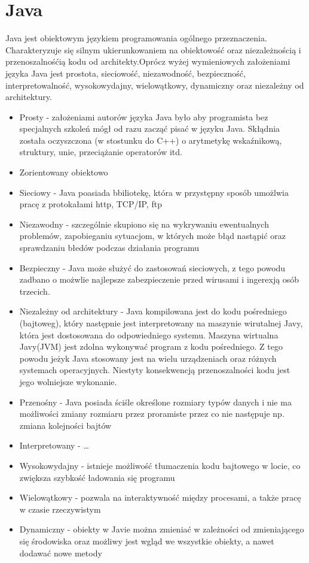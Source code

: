 \documentclass[eng,printmode,oneside]{mgr}
\begin{document}
\section{Java}

Java jest obiektowym językiem programowania ogólnego przeznaczenia.
Charakteryzuje się silnym ukierunkowaniem na obiektowość oraz niezależnością i
przenoszalnośćią kodu od architekty.Oprócz wyżej wymieniowych założeniami języka
Java jest prostota, sieciowość, niezawodność, bezpieczność, interpretowalność, wysokowydajny,
wielowątkowy, dynamiczny oraz niezależny od architektury. 
\begin{itemize}
  \item Prosty - założeniami autorów języka Java było aby programista bez
  specjalnych szkoleń mógł od razu zacząć pisać w języku Java. Skłądnia została
  oczyszczona (w stostunku do C++) o arytmetykę wskaźnikową, struktury, unie,
  przeciążanie operatorów itd.
  \item Zorientowany obiektowo
  \item Sieciowy - Java poasiada bbiliotekę, która w przystępny sposób umożlwia
  pracę z protokałami http, TCP/IP, ftp
  \item Niezawodny - szczególnie skupiono się na wykrywaniu ewentualnych
  problemów, zapobieganiu sytuacjom, w których może błąd nastąpić oraz
  sprawdzaniu błedów podczas działania programu
  \item Bezpieczny - Java może służyć do zastosowań sieciowych, z tego powodu
  zadbano o możwlie najlepsze zabezpieczenie przed wirusami i ingerexją osób
  trzecich.
  \item Niezależny od architektury - Java kompilowana jest do kodu pośredniego
  (bajtoweg), który następnie jest interpretowany na maszynie wirutalnej Javy,
  która jest dostosowana do odpowiedniego systemu. Maszyna wirtualna Javy(JVM)
  jest zdolna wykonywać program z kodu pośredniego. Z tego powodu jeżyk Java
  stosowany jest na wielu urządzeniach oraz różnych systemach operacyjnych.
  Niestyty konsekwencją przenoszalności kodu jest jego wolniejsze wykonanie.
  \item Przenośny - Java posiada ściśle określone rozmiary typów danych i nie ma
  możliwości zmiany rozmiaru przez proramiste przez co nie następuje np. zmiana
  kolejności bajtów
  \item Interpretowany - \ldots
  \item Wysokowydajny - istnieje możliwość tłumaczenia kodu bajtowego w locie,
  co zwiększa szybkość ładowania się programu
  \item Wielowątkowy - pozwala na interaktywność między procesami, a także pracę
  w czasie rzeczywistym
  \item Dynamiczny - obiekty w Javie można zmieniać w zależności od
  zmieniającego się środowiska oraz możliwy jest wgląd we wszystkie obiekty, a
  nawet dodawać nowe metody
\end{itemize}
\end{document}

